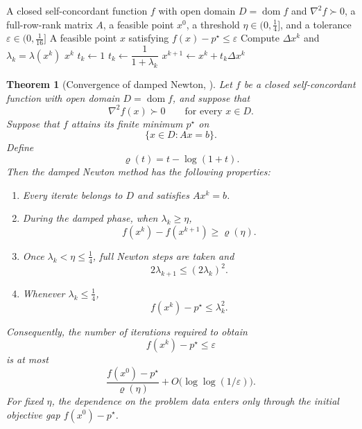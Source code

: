 \documentclass[a4paper,11pt]{book}
\theoremstyle{plain}
\newtheorem{theorem}{Theorem}[chapter]
\theoremstyle{definition}
\theoremstyle{remark}
\numberwithin{equation}{chapter}
\numberwithin{algorithm}{chapter}
\newcommand{\dom}{\operatorname{dom}}
\begin{document}
	
	\begin{algorithm}[H]
		\caption{Damped Newton method for a self-concordant function}
		\begin{algorithmic}[1]
			\Require A closed self-concordant function \(f\) with open domain
			\(D=\dom f\) and \(\nabla^2f\succ0\), a full-row-rank matrix \(A\), a
			feasible point \(x^0\), a threshold
			\(\eta\in(0,\tfrac14]\), and a tolerance
			\(\varepsilon\in(0,\tfrac1{16}]\)
			\Ensure A feasible point \(x\) satisfying
			\(f(x)-p^\star\leq\varepsilon\)
			\State Compute \(\Delta x^k\) and
			\(\lambda_k=\lambda(x^k)\)
			\State \Return \(x^k\)
			\EndIf
			\State \(t_k\gets1\)
			\Else
			\State \(t_k\gets\dfrac{1}{1+\lambda_k}\)
			\EndIf
			\State \(x^{k+1}\gets x^k+t_k\Delta x^k\)
			\EndFor
		\end{algorithmic}
	\end{algorithm}
	
	\begin{theorem}[Convergence of damped Newton,
		\cite{NesterovNemirovskii1994}]
		Let \(f\) be a closed self-concordant function with open domain
		\(D=\dom f\), and suppose that
		\[
		\nabla^2f(x)\succ0
		\qquad
		\text{for every }x\in D.
		\]
		Suppose that \(f\) attains its finite minimum \(p^\star\) on
		\[
		\{x\in D:Ax=b\}.
		\]
		Define
		\[
		\varrho(t)=t-\log(1+t).
		\]
		Then the damped Newton method has the following properties:
		
		\begin{enumerate}
			\item Every iterate belongs to \(D\) and satisfies \(Ax^k=b\).
			
			\item During the damped phase, when \(\lambda_k\geq\eta\),
			\[
			f(x^k)-f(x^{k+1})
			\geq
			\varrho(\eta).
			\]
			
			\item Once \(\lambda_k<\eta\leq\tfrac14\), full Newton steps are taken and
			\[
			2\lambda_{k+1}
			\leq
			(2\lambda_k)^2.
			\]
			
			\item Whenever \(\lambda_k\leq\tfrac14\),
			\[
			f(x^k)-p^\star
			\leq
			\lambda_k^2.
			\]
		\end{enumerate}
		
		Consequently, the number of iterations required to obtain
		\[
		f(x^k)-p^\star\leq\varepsilon
		\]
		is at most
		\begin{equation}
			\frac{f(x^0)-p^\star}{\varrho(\eta)}
			+
			O\bigl(\log\log(1/\varepsilon)\bigr).
		\end{equation}
		For fixed \(\eta\), the dependence on the problem data enters only through
		the initial objective gap \(f(x^0)-p^\star\).
	\end{theorem}
	
\end{document}
